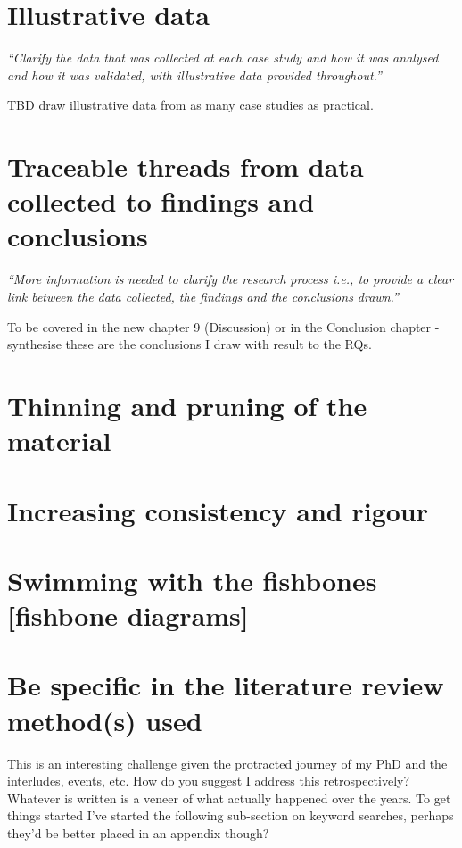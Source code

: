 \section{Illustrative data}
\emph{``Clarify the data that was collected at each case study and how it was analysed and how it was validated, with illustrative data provided throughout.''}

TBD draw illustrative data from as many case studies as practical.

\section{Traceable threads from data collected to findings and conclusions}
\emph{``More information is needed to clarify the research process i.e., to provide a clear link between the data collected, the findings and the conclusions drawn.''}

To be covered in the new chapter 9 (Discussion) or in the Conclusion chapter - synthesise these are the conclusions I draw with result to the RQs.

\section{Thinning and pruning of the material}

\section{Increasing consistency and rigour}

\section{Swimming with the fishbones [fishbone diagrams]}

\section{Be specific in the literature review method(s) used}
\begin{kaobox}
    This is an interesting challenge given the protracted journey of my PhD and the interludes, events, etc. How do you suggest I address this retrospectively? Whatever is written is a veneer of what actually happened over the years. To get things started I've started the following sub-section on keyword searches, perhaps they'd be better placed in an appendix though?
\end{kaobox}

